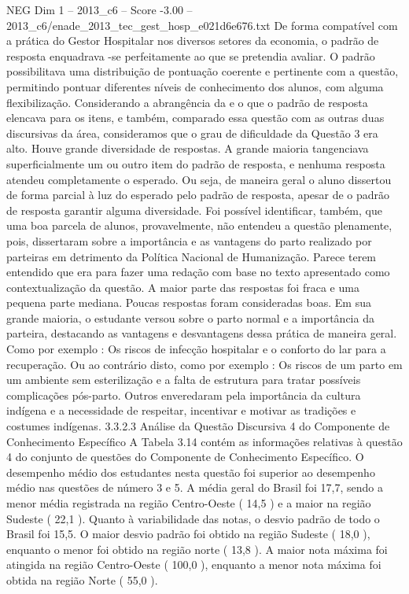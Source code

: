 \begin{textsample}{NEG Dim 1 – 2013\_c6 – Score -3.00 – 2013\_c6/enade\_2013\_tec\_gest\_hosp\_e021d6e676.txt}
De forma compatível com a prática do Gestor Hospitalar nos diversos setores da economia, o padrão de resposta enquadrava -se perfeitamente ao que se pretendia avaliar.
O padrão possibilitava uma distribuição de pontuação coerente e pertinente com a questão, permitindo pontuar diferentes níveis de conhecimento dos alunos, com alguma flexibilização.
Considerando a abrangência da e o que o padrão de resposta elencava para os itens, e também, comparado essa questão com as outras duas discursivas da área, consideramos que o grau de dificuldade da Questão 3 era alto.
Houve grande diversidade de respostas.
A grande maioria tangenciava superficialmente um ou outro item do padrão de resposta, e nenhuma resposta atendeu completamente o esperado.
Ou seja, de maneira geral o aluno dissertou de forma parcial à luz do esperado pelo padrão de resposta, apesar de o padrão de resposta garantir alguma diversidade.
Foi possível identificar, também, que uma boa parcela de alunos, provavelmente, não entendeu a questão plenamente, pois, dissertaram sobre a importância e as vantagens do parto realizado por parteiras em detrimento da Política Nacional de Humanização.
Parece terem entendido que era para fazer uma redação com base no texto apresentado como contextualização da questão.
A maior parte das respostas foi fraca e uma pequena parte mediana.
Poucas respostas foram consideradas boas.
Em sua grande maioria, o estudante versou sobre o parto normal e a importância da parteira, destacando as vantagens e desvantagens dessa prática de maneira geral.
Como por exemplo : Os riscos de infecção hospitalar e o conforto do lar para a recuperação.
Ou ao contrário disto, como por exemplo : Os riscos de um parto em um ambiente sem esterilização e a falta de estrutura para tratar possíveis complicações pós-parto.
Outros enveredaram pela importância da cultura indígena e a necessidade de respeitar, incentivar e motivar as tradições e costumes indígenas. 3.3.2.3 Análise da Questão Discursiva 4 do Componente de Conhecimento Específico A Tabela 3.14 contém as informações relativas à questão 4 do conjunto de questões do Componente de Conhecimento Específico.
O desempenho médio dos estudantes nesta questão foi superior ao desempenho médio nas questões de número 3 e 5.
A média geral do Brasil foi 17,7, sendo a menor média registrada na região Centro-Oeste ( 14,5 ) e a maior na região Sudeste ( 22,1 ).
Quanto à variabilidade das notas, o desvio padrão de todo o Brasil foi 15,5.
O maior desvio padrão foi obtido na região Sudeste ( 18,0 ), enquanto o menor foi obtido na região norte ( 13,8 ).
A maior nota máxima foi atingida na região Centro-Oeste ( 100,0 ), enquanto a menor nota máxima foi obtida na região Norte ( 55,0 ).

\end{textsample}
